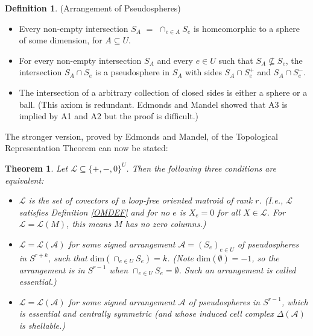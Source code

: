 \documentclass{amsproc-sunycstr}
\theoremstyle{plain}
\newtheorem{theorem}{Theorem}
\theoremstyle{definition}
\newtheorem{definition}{Definition}
\theoremstyle{remark}
\begin{document}
\begin{definition}(Arrangement of Pseudospheres)\\
\begin{itemize}
\item[A1] Every non-empty intersection $S_A$ $=$ $\cap_{e\in A}S_e$ is
homeomorphic to a sphere of some dimension, for $A\subseteq U$.
\item[A2] For every non-empty intersection $S_A$ and every $e\in U$ such
that $S_A\not\subseteq S_e$, the intersection $S_A\cap S_e$ is a pseudosphere
in $S_A$ with sides $S_A\cap S_e^+$ and $S_A\cap S_e^-$.
\item[A3] The intersection of a arbitrary collection of closed sides is 
either a sphere or a ball.  (This axiom is redundant.
Edmonds and Mandel \cite{} showed 
that A3 is implied by A1 and A2 but the proof is difficult.)
\end{itemize}
\end{definition}

The stronger version, proved by Edmonds and Mandel,
of the Topological Representation Theorem can now be stated:

\begin{theorem}
Let $\mathcal{L}\subseteq\{+,-,0\}^U$.  Then the following three conditions
are equivalent:
\begin{itemize}
\item[(i)] $\mathcal{L}$ is the set of covectors of a loop-free oriented
matroid of rank $r$.  (I.e., $\mathcal{L}$ satisfies Definition
\ref{OMDEF} and for no
$e$ is $X_e=0$ for all $X\in\mathcal{L}$.  For $\mathcal{L}=\mathcal{L}(M)$,
this means $M$ has no zero columns.)
\item[(ii)] $\mathcal{L}=\mathcal{L}(\mathcal{A})$ for some signed arrangement
$\mathcal{A}=(S_e)_{e\in U}$ of pseudospheres in 
$S^{r+k}$, such that $\mathrm{dim}(\cap_{e\in U}S_e) = k$.  (Note 
$\mathrm{dim}(\emptyset) = -1$, so the arrangement is in $S^{r-1}$ when
$\cap_{e\in U}S_e=\emptyset$.  Such an arrangement is 
called \textit{essential}.)
\item[(iii)]
$\mathcal{L}=\mathcal{L}(\mathcal{A})$ for some signed arrangement
$\mathcal{A}$ of pseudospheres in $S^{r-1}$, which is essential and centrally
symmetric (and whose induced cell complex $\Delta(\mathcal{A})$ is 
shellable.)
\end{itemize}
\end{theorem}
\end{document}
